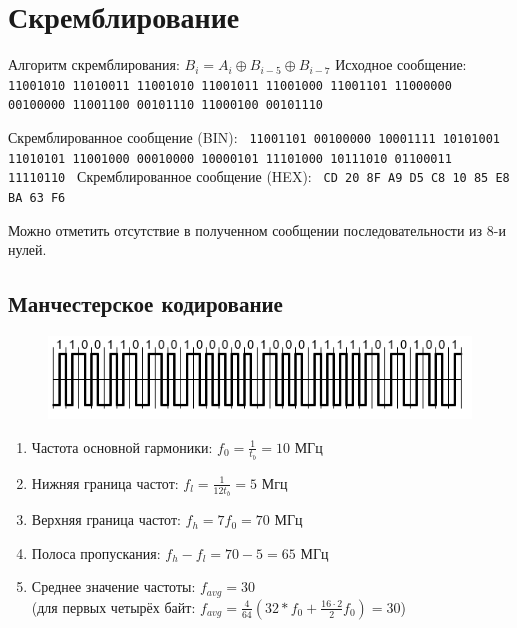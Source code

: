 \documentclass[12pt, a4paper] {ncc}
\begin{document}
\section*{Скремблирование}

	Алгоритм скремблирования: $B_i = A_i \oplus B_{i-5} \oplus B_{i-7}$
	Исходное сообщение:  \texttt{ 11001010 11010011 11001010 11001011
        						  11001000 11001101 11000000 00100000
        						  11001100 00101110 11000100 00101110
						  }

	
	Скремблированное сообщение (BIN): \texttt { 11001101 00100000 10001111 10101001 
											   11010101 11001000 00010000 10000101
											   11101000 10111010 01100011 11110110
									  }
	Скремблированное сообщение (HEX): \texttt { CD 20 8F A9 D5 C8 10 85 E8 BA 63 F6 }

	Можно отметить отсутствие в полученном сообщении последовательности из 8-и нулей.

	\subsection*{Манчестерское кодирование}
		\begin{figure}[h!]
			\includegraphics{../img/ManchesterS57.png}
		\end{figure}
		\begin{enumerate}
			\item Частота основной гармоники: $f_0 = \frac {1} {t_b} = 10$ МГц 
			\item Нижняя граница частот: $f_l = \frac {1} {12t_b} = 5$ Мгц
			\item Верхняя граница частот: $f_h = 7f_0 = 70$ МГц
			\item Полоса пропускания: $f_h - f_l = 70 - 5 = 65$ МГц 
			\item Среднее значение частоты: $f_{avg} = 30$ \\
				  (для первых четырёх байт: $f_{avg} = \frac {4} {64} (32*f_0 + \frac {16 \cdot 2} {2} f_0) = 30 $)
		\end{enumerate}
\end{document}
